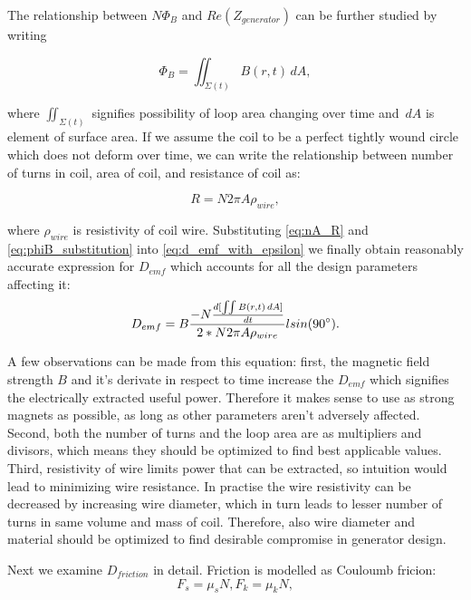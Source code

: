 The relationship between $N \Phi_{B}$ and $Re(Z_{generator})$ can be further studied by writing 

\begin{equation}\label{eq:phiB_substitution}
  \Phi_{B} = \iint_{\Sigma (t)} B(r, t) \,dA,
\end{equation}

 where $ \iint_{\Sigma (t)} $ signifies possibility of loop area changing over time and $\,dA$ is element of surface area. If we assume the coil to be a perfect tightly wound circle which does not deform over time, we can write the relationship between number of turns in coil, area of coil, and resistance of coil as:

\begin{equation}\label{eq:nA_R}
  R = N 2\pi A \rho_{wire},
\end{equation}

where $\rho_{wire}$ is resistivity of coil wire. Substituting \eqref{eq:nA_R} and \eqref{eq:phiB_substitution} into \eqref{eq:d_emf_with_epsilon} we finally obtain reasonably accurate expression for $D_{emf}$ which accounts for all the design parameters affecting it:
\begin{equation}\label{eq:d_emf_complete}
  D_{emf} = B \frac{-N \frac{d [\iint B(r, t) \,dA]}{d t}}{2*N 2\pi A \rho_{wire}} l sin(90 \degree).
\end{equation}

A few observations can be made from this equation: first, the magnetic field strength $B$ and it's derivate in respect to time increase the $D_{emf}$ which signifies the electrically extracted useful power. Therefore it makes sense to use as strong magnets as possible, as long as other parameters aren't adversely affected. Second, both the number of turns and the loop area are as multipliers and divisors, which means  they should be optimized to find best applicable values. Third, resistivity of wire limits power that can be extracted, so intuition would lead to minimizing wire resistance. In practise the wire resistivity can be decreased by increasing wire diameter, which in turn leads to lesser number of turns in same volume and mass of coil. Therefore, also wire diameter and material should be optimized to find desirable compromise in generator design. 

Next we examine $D_{friction}$ in detail. Friction is modelled as Couloumb fricion:
\begin{equation}\label{eq:couloumb_friction}
  F_s = \mu_sN,
  F_k = \mu_kN,
\end{equation}

